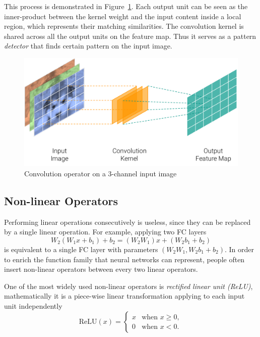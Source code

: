 This process is demonstrated in Figure~\ref{fig:dl-conv}. Each output unit can be seen as the inner-product between the kernel weight and the input content inside a local region, which represents their matching similarities. The convolution kernel is shared across all the output units on the feature map. Thus it serves as a pattern \emph{detector} that finds certain pattern on the input image.
\begin{figure}[t]
\begin{center}
\includegraphics[width=1.0\linewidth]{figures/convolution.pdf}
\caption{Convolution operator on a 3-channel input image}
\label{fig:dl-conv}
\end{center}
\end{figure}

\subsection{Non-linear Operators} %
\label{sub:dl-nonlinops}
Performing linear operations consecutively is useless, since they can be replaced by a single linear operation. For example, applying two FC layers
\begin{equation}
  W_2(W_1x+b_1)+b_2 = (W_2W_1)x +(W_2b_1+b_2)
\end{equation}
is equivalent to a single FC layer with parameters $(W_2W_1, W_2b_1+b_2)$. In order to enrich the function family that neural networks can represent, people often insert non-linear operators between every two linear operators.

One of the most widely used non-linear operators is \emph{rectified linear unit (ReLU)}, mathematically it is a piece-wise linear transformation applying to each input unit independently
\begin{equation}
  \mathrm{ReLU}(x) = \begin{cases}
    x & \text{when }x \ge 0,\\
    0 & \text{when }x < 0.
  \end{cases}
\end{equation}


